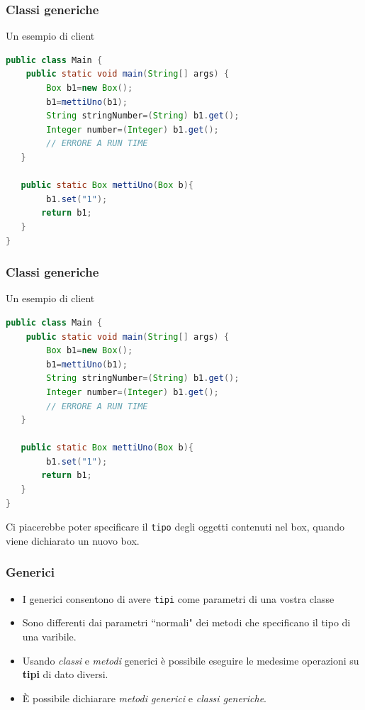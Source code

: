 \documentclass{beamer}
\begin{document}
\begin{frame}[fragile]
\frametitle{Classi generiche}
Un esempio di client
\begin{framed}
\begin{lstlisting}[language=Java]
public class Main {
    public static void main(String[] args) {
        Box b1=new Box();
        b1=mettiUno(b1);
        String stringNumber=(String) b1.get();
        Integer number=(Integer) b1.get(); 
        // ERRORE A RUN TIME
   }
   
   public static Box mettiUno(Box b){
        b1.set("1");
       return b1;
   }
}
\end{lstlisting}
\end{framed}
\end{frame}


\begin{frame}[fragile]
\frametitle{Classi generiche}
Un esempio di client
\begin{framed}
\begin{lstlisting}[language=Java]
public class Main {
    public static void main(String[] args) {
        Box b1=new Box();
        b1=mettiUno(b1);
        String stringNumber=(String) b1.get();
        Integer number=(Integer) b1.get(); 
        // ERRORE A RUN TIME
   }
   
   public static Box mettiUno(Box b){
        b1.set("1");
       return b1;
   }
}
\end{lstlisting}
\end{framed}
Ci piacerebbe poter specificare il \texttt{tipo} degli oggetti contenuti nel box, quando viene dichiarato un nuovo box.
\end{frame}



\begin{frame}
\frametitle{Generici}
\begin{itemize}
\item I generici consentono di avere \texttt{tipi} come parametri di una vostra classe
\item Sono differenti dai parametri ``normali" dei metodi che specificano il tipo di una varibile.
\item Usando \emph{classi} e \emph{metodi} generici \`e possibile eseguire le medesime operazioni su \textbf{tipi} di dato diversi.
\item \`E possibile dichiarare \emph{metodi generici} e \emph{classi generiche}.
\end{itemize}
\end{frame}
\end{document}
